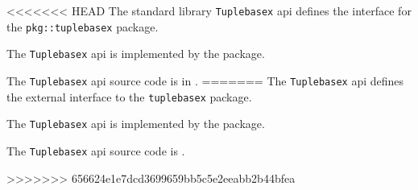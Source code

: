 
<<<<<<< HEAD
The standard library {\tt Tuplebasex} api defines the interface for the {\tt pkg::tuplebasex} package.

The {\tt Tuplebasex} api is implemented by the 
 package.

The {\tt Tuplebasex} api source code is in .
=======
The {\tt Tuplebasex} api defines the external interface to the {\tt tuplebasex} package.

The {\tt Tuplebasex} api is implemented by the  package.

The {\tt Tuplebasex} api source code is .


>>>>>>> 656624e1e7dcd3699659bb5c5e2eeabb2b44bfea
